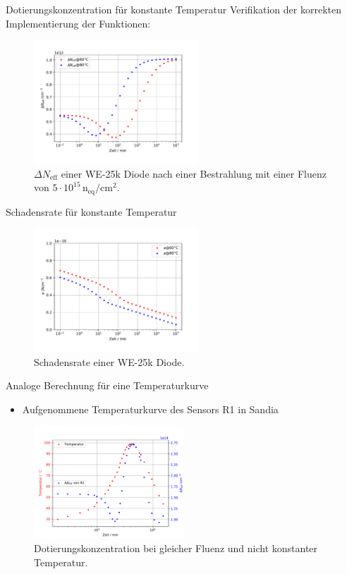 \documentclass[aspectratio=1610, 9pt]{beamer}
\begin{document}
\begin{frame}{Dotierungskonzentration für konstante Temperatur}
  Verifikation der korrekten Implementierung der Funktionen:
  \begin{figure}
      \includegraphics[width=0.55\textwidth]{images/annealing.PDF}
  \caption{$\Delta N_{\mathrm{eff}}$ einer WE-25k Diode nach einer Bestrahlung mit einer Fluenz von
    $5\cdot 10^{15} \, \mathrm{n_{\mathrm{eq}}/cm^2}$.}
  \end{figure}
\end{frame}

\begin{frame}{Schadensrate für konstante Temperatur}
  \begin{figure}
      \includegraphics[width=0.55\textwidth]{images/damage.PDF}
  \caption{Schadensrate einer WE-25k Diode.}
  \end{figure}
\end{frame}


\begin{frame}{Analoge Berechnung für eine Temperaturkurve}
  \begin{itemize}
    \item Aufgenommene Temperaturkurve des Sensors R1 in Sandia
  \end{itemize}
  \begin{figure}
      \includegraphics[width=0.5\textwidth]{images/ohnekorrektur.PDF}
  \caption{Dotierungskonzentration bei gleicher Fluenz und nicht konstanter Temperatur.}
  \end{figure}
\end{frame}
\end{document}
